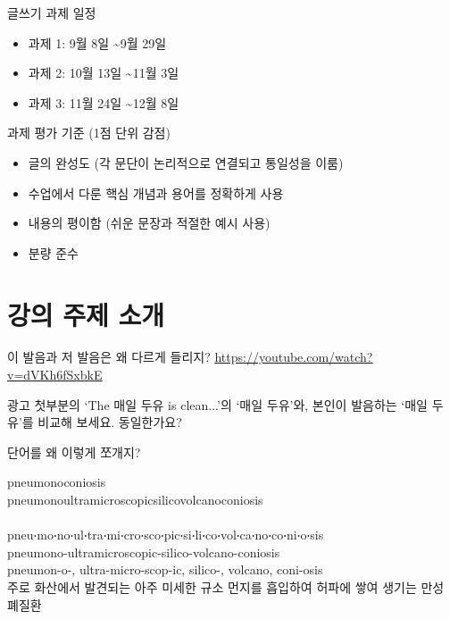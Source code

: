 \documentclass[11pt, aspectratio=169]{beamer}
\begin{document}
\begin{frame}[t]{}

    \begin{block}{글쓰기 과제 일정}
        \begin{itemize}
          \item 과제 1: 9월 8일 \textasciitilde 9월 29일
          \item 과제 2: 10월 13일 \textasciitilde 11월 3일
          \item 과제 3: 11월 24일 \textasciitilde 12월 8일
        \end{itemize}      
    \end{block}  

  \begin{block}{과제 평가 기준 (1점 단위 감점)}
    \begin{itemize}
      \item 글의 완성도 (각 문단이 논리적으로 연결되고 통일성을 이룸)
      \item 수업에서 다룬 핵심 개념과 용어를 정확하게 사용
      \item 내용의 평이함 (쉬운 문장과 적절한 예시 사용)
      \item 분량 준수 
    \end{itemize}
  \end{block}

\end{frame}

\section{강의 주제 소개}

\begin{frame}[t]{}
  \begin{block}{이 발음과 저 발음은 왜 다르게 들리지?}
    \href{https://youtube.com/watch?v=dVKh6fSxbkE}{\underline{https://youtube.com/watch?v=dVKh6fSxbkE}}
  \end{block}
  광고 첫부분의 ‘The 매일 두유 is clean...’의 ‘매일 두유’와, 본인이 발음하는 ‘매일 두유’를 비교해 보세요. 동일한가요?
\end{frame}

\begin{frame}[t]{}
  \begin{block}{단어를 왜 이렇게 쪼개지?}
    \begin{center}
      pneumonoconiosis\\
      pneumonoultramicroscopicsilicovolcanoconiosis\\
      \\
      {\small pneu‧mo‧no‧ul‧tra‧mi‧cro‧sco‧pic‧si‧li‧co‧vol‧ca‧no‧co‧ni‧o‧sis}\\
      pneumono-ultramicroscopic-silico-volcano-coniosis\\
      pneumon-o-, ultra-micro-scop-ic, silico-, volcano, coni-osis\\
      {\small 주로 화산에서 발견되는 아주 미세한 규소 먼지를 흡입하여 허파에 쌓여 생기는 만성 폐질환}      
    \end{center}
  \end{block}  
\end{frame}
\end{document}
